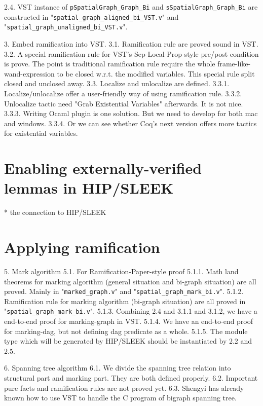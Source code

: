 \documentclass[pldi]{sigplanconf-pldi15}
\begin{document}
2.4. VST instance of \texttt{pSpatialGraph\_Graph\_Bi} and \texttt{sSpatialGraph\_Graph\_Bi} are constructed in "\texttt{spatial\_graph\_aligned\_bi\_VST.v}" and "\texttt{spatial\_graph\_unaligned\_bi\_VST.v}".

3. Embed ramification into VST.
3.1. Ramification rule are proved sound in VST.
3.2. A special ramification rule for VST's Sep-Local-Prop style pre/post condition is prove. The point is traditional ramification rule require the whole frame-like-wand-expression to be closed w.r.t. the modified variables. This special rule split closed and unclosed away.
3.3. Localize and unlocalize are defined.
3.3.1. Localize/unlocalize offer a user-friendly way of using ramification rule.
3.3.2. Unlocalize tactic need "Grab Existential Variables" afterwards. It is not nice.
3.3.3. Writing Ocaml plugin is one solution. But we need to develop for both mac and windows.
3.3.4. Or we can see whether Coq's next version offers more tactics for existential variables.

\section{Enabling externally-verified lemmas in HIP/SLEEK}

* the connection to HIP/SLEEK

\section{Applying ramification}

5. Mark algorithm
5.1. For Ramification-Paper-style proof
5.1.1. Math land theorems for marking algorithm (general situation and bi-graph situation) are all proved. Mainly in "\texttt{marked\_graph.v}" and "\texttt{spatial\_graph\_mark\_bi.v}".
5.1.2. Ramification rule for marking algorithm (bi-graph situation) are all proved in "\texttt{spatial\_graph\_mark\_bi.v}".
5.1.3. Combining 2.4 and 3.1.1 and 3.1.2, we have a end-to-end proof for marking-graph in VST.
5.1.4. We have an end-to-end proof for marking-dag, but not defining dag predicate as a whole.
5.1.5. The module type which will be generated by HIP/SLEEK should be instantiated by 2.2 and 2.5.

6. Spanning tree algorithm
6.1. We divide the spanning tree relation into structural part and marking part. They are both defined properly.
6.2. Important pure facts and ramification rules are not proved yet.
6.3. Shengyi has already known how to use VST to handle the C program of bigraph spanning tree.
\end{document}
